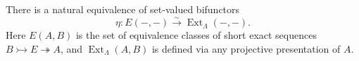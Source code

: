 There is a natural equivalence of set-valued bifunctors
$$\eta : E(-, -) \xrightarrow{\sim} \operatorname{Ext}_{\Lambda}(-, -).$$
Here $E(A, B)$ is the set of equivalence classes of short exact sequences $B \rightarrowtail E \twoheadrightarrow A$, and $\operatorname{Ext}_{\Lambda}(A, B)$ is defined via any projective presentation of $A$.
